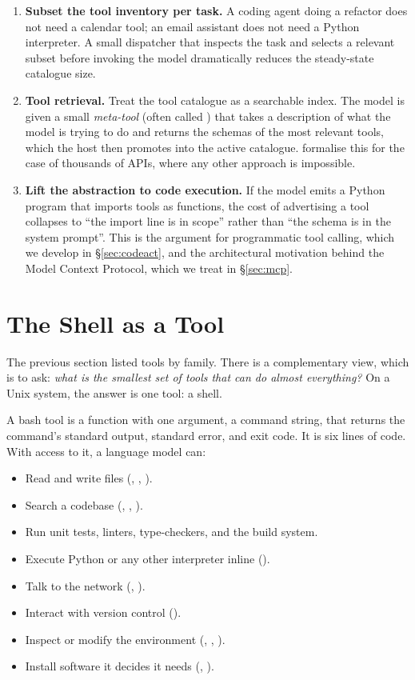 \begin{enumerate}[label=(\arabic*)]
\item \textbf{Subset the tool inventory per task.} A coding agent
  doing a refactor does not need a calendar tool; an email assistant
  does not need a Python interpreter. A small dispatcher that
  inspects the task and selects a relevant subset before invoking
  the model dramatically reduces the steady-state catalogue size.
\item \textbf{Tool retrieval.} Treat the tool catalogue as a
  searchable index. The model is given a small \emph{meta-tool}
  (often called ) that takes a description of what
  the model is trying to do and returns the schemas of the most
  relevant tools, which the host then promotes into the active
  catalogue. \citet{patil2023gorilla} formalise this for the case of
  thousands of APIs, where any other approach is impossible.
\item \textbf{Lift the abstraction to code execution.} If the model
  emits a Python program that imports tools as functions, the cost
  of advertising a tool collapses to ``the import line is in scope''
  rather than ``the schema is in the system prompt''. This is the
  argument for programmatic tool calling, which we develop in
  \S\ref{sec:codeact}, and the architectural motivation behind the
  Model Context Protocol, which we treat in \S\ref{sec:mcp}.
\end{enumerate}

\section{The Shell as a Tool}
\label{sec:shell}

The previous section listed tools by family. There is a complementary
view, which is to ask: \emph{what is the smallest set of tools that
can do almost everything?} On a Unix system, the answer is one tool:
a shell.

A bash tool is a function with one argument, a command string, that
returns the command's standard output, standard error, and exit
code. It is six lines of code. With access to it, a language model
can:

\begin{itemize}[leftmargin=1.5em,topsep=0.2em,itemsep=0.1em]
\item Read and write files (, , ).
\item Search a codebase (, , ).
\item Run unit tests, linters, type-checkers, and the build system.
\item Execute Python or any other interpreter inline
  ().
\item Talk to the network (, ).
\item Interact with version control ().
\item Inspect or modify the environment (, ,
  ).
\item Install software it decides it needs (,
  ).
\end{itemize}

